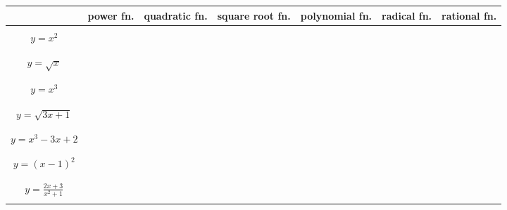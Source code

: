 \documentclass{article}
\begin{document}
\begin{tabular}{| c | c | c | c | c | c | c |}
\hline
 & power fn. & quadratic fn. & square root fn. & polynomial fn. & radical fn. & rational fn. \\
\hline
& & & & & &\\
$y=x^2$ & & & & & &\\
& & & & & &\\
\hline
& & & & & &\\
$y=\sqrt{x}$ & & & & & &\\
& & & & & &\\
\hline
& & & & & &\\
$y=x^3$ & & & & & &\\
& & & & & &\\
\hline
& & & & & &\\
$y=\sqrt{3x+1}$ & & & & & &\\
& & & & & &\\
\hline 
& & & & & &\\
$y=x^3 - 3x + 2$ & & & & & &\\
& & & & & &\\
\hline 
& & & & & &\\
$y=(x-1)^2$ & & & & & &\\
& & & & & &\\
\hline 
& & & & & &\\
$y=\frac{2x+3}{x^2+1}$ & & & & & &\\
& & & & & &\\
\hline 
\end{tabular}
\end{document}
